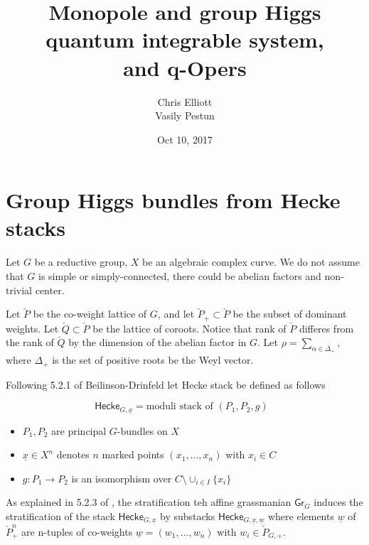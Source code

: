 \documentclass[12pt,psamsfonts,reqno]{amsart}
\title{Monopole and group Higgs quantum integrable system, \\
    and q-Opers}
\author{ Chris Elliott \\ Vasily Pestun}
\date{Oct 10, 2017}
\begin{document}
\maketitle

\newcommand{\GrHiggs}{\mathsf{GrHiggs}}
\newcommand{\Bun}{\mathsf{Bun}}
\newcommand{\Mon}{\mathsf{Mon}}


\newcommand{\Hecke}{\mathsf{Hecke}}

\section{Group Higgs bundles from Hecke stacks}

\newcommand{\sn}{\mathsf{n}}
\newcommand{\fr}{\mathrm{fr}}
Let $G$ be a reductive group, $X$ be an algebraic complex curve. We do not assume
that $G$ is simple or simply-connected, there could be abelian factors and non-trivial
center. 

Let $\check P$ be the co-weight lattice of $G$, and let
$\check P_{+} \subset \check P$ be the subset of dominant weights.
Let $\check Q \subset \check P$ be the lattice of coroots. Notice
that rank of $\check P$ differes from the rank of $\check Q$ by
the dimension of the abelian factor in $G$. 
Let $\rho = \sum_{\alpha \in \Delta_{+}}$, where $\Delta_{+}$ is the set of
positive roots be the Weyl vector. 


Following 5.2.1 of Beilinson-Drinfeld \cite{Beilinson:Drinfeld}
let Hecke stack be defined as follows

\begin{definition}
\begin{equation}
  \Hecke_{G, \underline{x}} = \text{moduli stack of  $(P_1, P_2 , g)$ }
\end{equation}
\begin{itemize}
\item $P_1, P_2$ are principal $G$-bundles on $X$
\item $\underline{x} \in X^n$ denotes $n$ marked points $(x_1, \dots, x_n)$ with $x_i \in C$
\item $g: P_{1} \to P_{2}$ is an isomorphism over $C \setminus \cup_{i \in I} \{ x_i \}$ 
\end{itemize}
\end{definition}
As explained
in 5.2.3 of  \cite{Beilinson:Drinfeld}, the stratification teh affine grassmanian
$\mathsf{Gr}_{G}$ induces the stratification of the stack $\Hecke_{G,\underline{x}}$ by
substacks $\Hecke_{G,\underline{x}, \underline{w}}$ where elements $\underline{w}$ of $\check P_{+}^{n}$
  are n-tuples of co-weights $\underline{w} = (w_1, \dots, w_n)$ with $w_i \in \check P_{G,+}$. 
\end{document}
